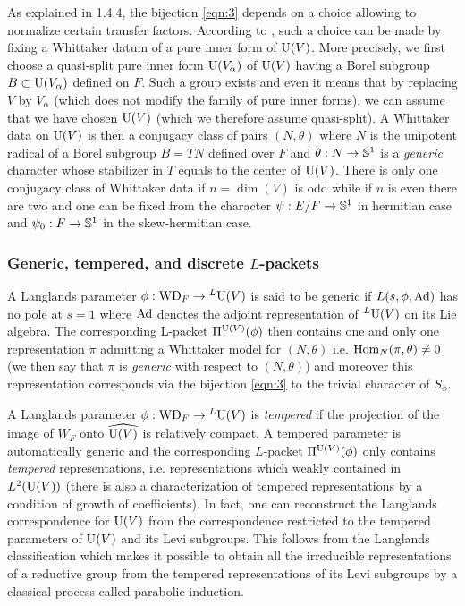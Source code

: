As explained in 1.4.4, the bijection \eqref{eqn:3} depends on a choice allowing to normalize certain transfer factors.
According to \cite{kottwitz1999foundations}, such a choice can be made by fixing a Whittaker datum of a pure inner form of $\mathrm{U}(V)$.
More precisely, we first choose a quasi-split pure inner form $\mathrm{U}(V_\alpha)$ of $\mathrm{U}(V)$ having a Borel subgroup $B \subset \mathrm{U}(V_\alpha)$ defined on $F$.
Such a group exists and even it means that by replacing $V$ by $V_\alpha$ (which does not modify the family of pure inner forms), we can assume that we have chosen $\mathrm{U}(V)$ (which we therefore assume quasi-split).
A Whittaker data on $\mathrm{U}(V)$ is then a conjugacy class of pairs $(N, \theta)$ where $N$ is the unipotent radical of a Borel subgroup $B = TN$ defined over $F$ and $\theta: N \to \mathbb{S}^1$ is a \emph{generic} character whose stabilizer in $T$ equals to the center of $\mathrm{U}(V)$.
There is only one conjugacy class of Whittaker data if $n = \dim(V)$ is odd while if $n$ is even there are two and one can be fixed from the
character $\psi: E /F \to \mathbb{S}^1$ in hermitian case and $\psi_0: F \to \mathbb{S}^1$ in the skew-hermitian case.


\subsubsection{Generic, tempered, and discrete $L$-packets}

A Langlands parameter $\phi: \mathrm{WD}_F \to {}^L \mathrm{U}(V)$ is said to be generic if $L(s, \phi, \mathrm{Ad})$ has no pole at $s = 1$ where $\mathrm{Ad}$ denotes the adjoint representation of ${}^L \mathrm{U}(V)$ on its Lie algebra.
The corresponding L-packet $\Pi^{\mathrm{U}(V)}(\phi)$ then contains one and only one representation $\pi$ admitting a Whittaker model for $(N, \theta)$ i.e. $\mathrm{Hom}_{N}(\pi, \theta) \neq 0$ (we then say that $\pi$ is \emph{generic} with respect to $(N, \theta)$) and moreover this representation corresponds via the bijection \eqref{eqn:3} to the trivial character of $S_\phi$.

A Langlands parameter $\phi: \mathrm{WD}_F \to {}^L \mathrm{U}(V)$ is \emph{tempered} if the projection of the image of $W_F$ onto $\widehat{\mathrm{U}(V)}$ is relatively compact.
A tempered parameter is automatically generic and the corresponding $L$-packet $\Pi^{\mathrm{U}(V)}(\phi)$ only contains \emph{tempered} representations, i.e. representations which weakly contained in $L^2(\mathrm{U}(V))$ (there is also a characterization of tempered representations by a condition of growth of coefficients).
In fact, one can reconstruct the Langlands correspondence for $\mathrm{U}(V)$ from the correspondence restricted to the tempered parameters of $\mathrm{U}(V)$ and its Levi subgroups.
This follows from the Langlands classification which makes it possible to obtain all the irreducible representations of a reductive group from the tempered representations of its Levi subgroups by a classical process called parabolic induction.

